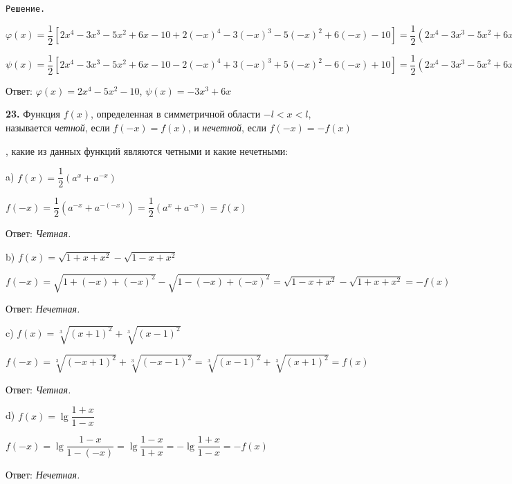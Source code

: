 \documentclass[12pt]{article}
\begin{document}
{\tt Решение.}

$\varphi(x) = \dfrac{1}{2}[2x^4-3x^3-5x^2+6x-10+2(-x)^4-3(-x)^3-5(-x)^2+6(-x)-10] = \dfrac{1}{2}(2x^4-3x^3-5x^2+6x-10+2x^4+3x^3-5x^2-6x-10) = \dfrac{1}{2}(4x^4-10x^2-20) = 2x^4-5x^2-10$\vspace{2mm}

$\psi(x) = \dfrac{1}{2}[2x^4-3x^3-5x^2+6x-10-2(-x)^4+3(-x)^3+5(-x)^2-6(-x)+10] = \dfrac{1}{2}(2x^4-3x^3-5x^2+6x-10-2x^4-3x^3+5x^2+6x+10) = \dfrac{1}{2}(-6x^3+12x) = -3x^3+6x$\vspace{2mm}
	
	Ответ: $\varphi(x) = 2x^4-5x^2-10$, $\psi(x) = -3x^3+6x$\vspace{2mm}
	
	
	{\bf 23.} Функция $f(x)$, определенная в симметричной области $-l<x<l$, называется {\it четной}, если $f(-x) = f(x)$, и {\it нечетной}, если $f(-x)=-f(x)$
	
{, какие из данных функций являются четными и какие нечетными:}\vspace{2mm}

a) $f(x) = \dfrac{1}{2}(a^x+a^{-x})$

\hspace{-3mm}{\tt Решение:} $f(-x) = \dfrac{1}{2}(a^{-x}+a^{-(-x)}) = \dfrac{1}{2}(a^x+a^{-x}) = f(x)$

Ответ: {\it Четная.}
\vspace{2mm}

b) $f(x) = \sqrt{1+x+x^2}-\sqrt{1-x+x^2}$

\hspace{-3mm}{\tt Решение:} $f(-x) = \sqrt{1+(-x)+(-x)^2} - \sqrt{1-(-x)+(-x)^2} = \sqrt{1-x+x^2}-\sqrt{1+x+x^2} = -f(x)$

Ответ: {\it Нечетная.}\vspace{2mm}

c) $f(x) = \sqrt[3]{(x+1)^2}+\sqrt[3]{(x-1)^2}$

\hspace{-3mm}{\tt Решение:} $f(-x) = \sqrt[3]{(-x+1)^2}+\sqrt[3]{(-x-1)^2} = \sqrt[3]{(x-1)^2}+\sqrt[3]{(x+1)^2} = f(x)$

Ответ: {\it Четная.}\vspace{2mm}

d) $f(x) = \lg\dfrac{1+x}{1-x}$

\hspace{-3mm}{\tt Решение:} $f(-x) = \lg\dfrac{1-x}{1-(-x)} = \lg\dfrac{1-x}{1+x} = -\lg\dfrac{1+x}{1-x} = -f(x)$
	
	Ответ: {\it Нечетная.}\vspace{2mm}
	
\end{document}
